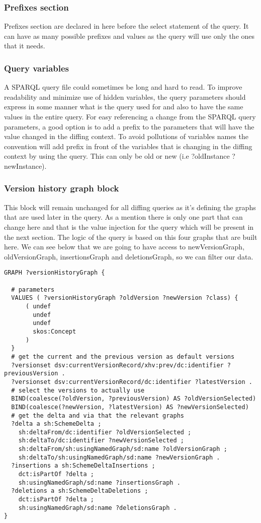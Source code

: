 \subsubsection{Prefixes section}
Prefixes section are declared in here before the select statement of the query. It can have as many possible prefixes and values as the query will use only the ones that it needs.

\subsubsection{Query variables}
A SPARQL query file could sometimes be long and hard to read. To improve readability and minimize use of hidden variables, the query parameters should express in some manner what is the query used for and also to have the same values in the entire query. For easy referencing a change from the SPARQL query parameters, a good option is to add a prefix to the parameters that will have the value changed in the diffing context. To avoid pollutions of variables names the convention will add prefix in front of the variables that is changing in the diffing context by using the query. This can only be old or new (i.e ?oldInstance ?newInstance).

\subsubsection{Version history graph block}
This block will remain unchanged for all diffing queries as it's defining the graphs that are used later in the query. As a mention there is only one part that can change here and that is the value injection for the query which will be present in the next section. The logic of the query is based on this four graphs that are built here. We can see below that we are going to have access to newVersionGraph, oldVersionGraph, insertionsGraph and deletionsGraph, so we can filter our data.

\begin{lstlisting}
GRAPH ?versionHistoryGraph {

  # parameters
  VALUES ( ?versionHistoryGraph ?oldVersion ?newVersion ?class) {
      ( undef 
        undef 
        undef  
        skos:Concept 
      )
  }
  # get the current and the previous version as default versions
  ?versionset dsv:currentVersionRecord/xhv:prev/dc:identifier ?previousVersion .
  ?versionset dsv:currentVersionRecord/dc:identifier ?latestVersion .
  # select the versions to actually use
  BIND(coalesce(?oldVersion, ?previousVersion) AS ?oldVersionSelected)
  BIND(coalesce(?newVersion, ?latestVersion) AS ?newVersionSelected)
  # get the delta and via that the relevant graphs
  ?delta a sh:SchemeDelta ;
    sh:deltaFrom/dc:identifier ?oldVersionSelected ;
    sh:deltaTo/dc:identifier ?newVersionSelected ;
    sh:deltaFrom/sh:usingNamedGraph/sd:name ?oldVersionGraph ;
    sh:deltaTo/sh:usingNamedGraph/sd:name ?newVersionGraph .
  ?insertions a sh:SchemeDeltaInsertions ;
    dct:isPartOf ?delta ;
    sh:usingNamedGraph/sd:name ?insertionsGraph .
  ?deletions a sh:SchemeDeltaDeletions ;
    dct:isPartOf ?delta ;
    sh:usingNamedGraph/sd:name ?deletionsGraph .
}
\end{lstlisting}

